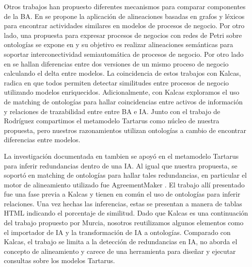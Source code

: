 Otros trabajos han propuesto diferentes mecanismos para comparar componentes de la BA. En \cite{Remco:2009} se propone la aplicaci\'on de alineaciones basadas en grafos y l\'exicos para encontrar actividades similares en modelos de procesos de negocio. Por otro lado, una propuesta para expresar procesos de negocios con redes de Petri sobre ontolog\'ias se expone en \cite{Brockmans:2006} y su objetivo es realizar alineaciones sem\'anticas para soportar interconectividad semiautom\'atica de procesos de negocio. Por otro lado en \cite{Rodriguez:2011} se hallan diferencias entre dos versiones de un mismo proceso de negocio calculando el delta entre modelos. La coincidencia de estos trabajos con Kalcas, radica en que todos permiten detectar similitudes entre procesos de negocio utilizando modelos enriquecidos. Adicionalmente, con Kalcas exploramos el uso de matching de ontolog\'ias para hallar coincidencias entre activos de informaci\'on y relaciones de trazabilidad entre entre BA e IA. Junto con el trabajo de Rodr\'iguez \cite{Rodriguez:2011} compartimos el metamodelo Tartarus como n\'ucleo de nuestra propuesta, pero nuestros razonamientos utilizan ontolog\'ias a cambio de encontrar diferencias entre modelos.

La investigaci\'on documentada en \cite{Murcia:2011} tambien se apoy\'o en el metamodelo Tartarus para inferir redundancias dentro de una IA. Al igual que nuestra propuesta, se soport\'o en matching de ontolog\'ias para hallar tales redundancias, en particular el motor de alineamiento utilizado fue AgreementMaker \cite{Cruz:2009}. El trabajo all\'i presentado fue una fase previa a Kalcas y tienen en com\'un el uso de ontolog\'ias para inferir relaciones. Una vez hechas las inferencias, estas se presentan a manera de tablas HTML indicando el porcentaje de similitud. Dado que Kalcas es una continuaci\'on del trabajo propuesto por Murcia, nosotros reutilizamos algunos elementos como el importador de IA y la transformaci\'on de IA a ontolog\'ias. Comparado con Kalcas, el trabajo se limita a la detecci\'on de redundancias en IA, no aborda el concepto de alineamiento y carece de una herramienta para dise\~nar y ejecutar consultas sobre los modelos Tartarus.

